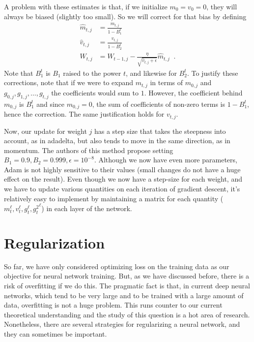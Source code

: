 A problem with these estimates is that, if we initialize $m_0 = v_0 = 0$,
they will always be biased (slightly too small).  So we will correct
for that bias  by defining
\begin{align*}
 \hat{m}_{t,j} & = \frac{m_{t,j}}{1 - B^t_1}  \\
 \hat{v}_{t,j} & = \frac{v_{t,j}}{1 - B^t_2}  \\
 W_{t,j} & = W_{t-1,j} - \frac{\eta}{\sqrt{\hat{v}_{t,j} +
    \epsilon}}\hat{m}_{t,j} \;\;.
\end{align*}
Note that $B^t_1$ is $B_1$ raised to the power $t$, and likewise for
$B^t_2$.  To justify these corrections, note that if we were to expand $m_{t,j}$
in terms of $m_{0,j}$ and $g_{0,j}, g_{1,j}, \dots, g_{t,j}$ the coefficients would
sum to $1$.  However, the coefficient behind $m_{0,j}$ is $B_1^t$ and since 
$m_{0,j} = 0$, the sum of coefficients of non-zero terms is $1 - B_1^t$, hence
the correction.  The same justification holds for $v_{t,j}$.

Now, our update for weight $j$ has a step size that takes the
steepness into account, as in adadelta, but also tends to move in the
same direction, as in momentum.  The authors of this method propose
setting $B_1 = 0.9, B_2 = 0.999, \epsilon = 10^{-8}$.  Although we now
have even more parameters, Adam is not highly sensitive to their values
(small changes do not have a huge effect on the result).
Even though we now have a step-size for each weight, and we have to
update various quantities on each iteration of gradient descent, it's
relatively easy to implement by maintaining a matrix for each quantity
($ m^{\ell}_t, v^{\ell}_t, g^{\ell}_t, {g^{2}_t}^{\ell} $) in each
layer of the network. 

\section{Regularization}
So far, we have only considered optimizing loss on the training data
as our objective for neural network training.   But, as we have
discussed before, there is a risk of overfitting if we do this.  The
pragmatic fact is that,  in current deep neural networks, which tend to be very
large and to be trained with a large amount of data,  overfitting is
not a huge problem.  This runs counter to our current theoretical
understanding and the study of this question is a hot area of
research.  Nonetheless, there are several strategies for regularizing
a neural network, and they can sometimes be important.

